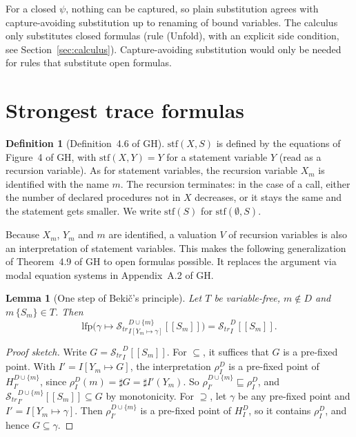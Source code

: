 \documentclass[11pt]{article}
\newcommand{\sem}[1]{[\![ #1 ]\!]}
\newcommand{\Str}{{\mathcal{S}_{\mathit{tr}}}}
\newcommand{\dup}{\sharp}
\newcommand{\stf}{\mathrm{stf}}
\newcommand{\lfp}{\mathrm{lfp}}
\newcommand{\GH}[1]{#1 of GH}
\theoremstyle{plain}
\newtheorem{lemma}[theorem]{Lemma}
\theoremstyle{definition}
\newtheorem{definition}[theorem]{Definition}
\theoremstyle{remark}
\begin{document}
For a closed $\psi$, nothing can be captured, so plain substitution agrees
with capture-avoiding substitution up to renaming of bound variables. The
calculus only substitutes closed formulas (rule (Unfold), with an explicit
side condition, see Section~\ref{sec:calculus}). Capture-avoiding
substitution would only be needed for rules that substitute open formulas.

\section{Strongest trace formulas}

\begin{definition}[\GH{Definition~4.6}]\label{def:stf}
  $\stf(X, S)$ is defined by the equations of \GH{Figure~4}, with
  $\stf(X, Y) = Y$ for a statement variable $Y$ (read as a recursion
  variable). As for statement variables, the recursion variable $X_m$ is
  identified with the name $m$. The recursion terminates: in the case of a
  call, either the number of declared procedures not in $X$ decreases, or it
  stays the same and the statement gets smaller. We write $\stf(S)$ for
  $\stf(\emptyset, S)$.
\end{definition}

Because $X_m$, $Y_m$ and $m$ are identified, a valuation $V$ of recursion
variables is also an interpretation of statement variables. This makes the
following generalization of \GH{Theorem~4.9} to open formulas possible. It
replaces the argument via modal equation systems in \GH{Appendix~A.2}.

\begin{lemma}[One step of Beki\v{c}'s principle]\label{lem:bekic}
  Let $T$ be variable-free, $m \notin D$ and $m\,\{S_m\} \in T$. Then
  \[
    \lfp\big(\gamma \mapsto \Str^{D \cup \{m\}}_{I[Y_m \mapsto \gamma]}\sem{S_m}\big)
    = \Str^D_I\sem{S_m}.
  \]
\end{lemma}

\begin{proof}[Proof sketch]
  Write $G = \Str^D_I\sem{S_m}$. For $\subseteq$, it suffices that $G$ is a
  pre-fixed point. With $I' = I[Y_m \mapsto G]$, the interpretation
  $\rho^D_I$ is a pre-fixed point of $H^{D \cup \{m\}}_{I'}$, since
  $\rho^D_I(m) = \dup G = \dup I'(Y_m)$. So
  $\rho^{D \cup \{m\}}_{I'} \sqsubseteq \rho^D_I$, and
  $\Str^{D \cup \{m\}}_{I'}\sem{S_m} \subseteq G$ by monotonicity. For
  $\supseteq$, let $\gamma$ be any pre-fixed point and
  $I' = I[Y_m \mapsto \gamma]$. Then $\rho^{D \cup \{m\}}_{I'}$ is a
  pre-fixed point of $H^D_I$, so it contains $\rho^D_I$, and hence
  $G \subseteq \gamma$.
\end{proof}
\end{document}
